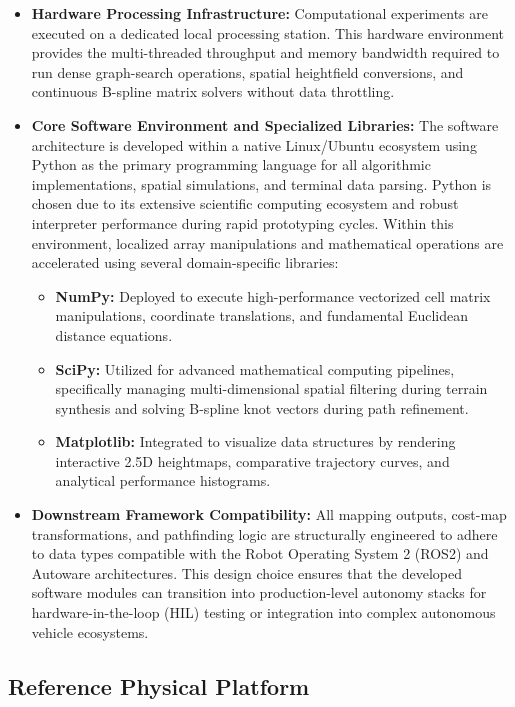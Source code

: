 \begin{itemize}
    \item \textbf{Hardware Processing Infrastructure:} Computational experiments are executed on a dedicated local processing station. This hardware environment provides the multi-threaded throughput and memory bandwidth required to run dense graph-search operations, spatial heightfield conversions, and continuous B-spline matrix solvers without data throttling.

    \item \textbf{Core Software Environment and Specialized Libraries:} The software architecture is developed within a native Linux/Ubuntu ecosystem using Python as the primary programming language for all algorithmic implementations, spatial simulations, and terminal data parsing. Python is chosen due to its extensive scientific computing ecosystem and robust interpreter performance during rapid prototyping cycles. Within this environment, localized array manipulations and mathematical operations are accelerated using several domain-specific libraries:
    \begin{itemize}
        \item \textbf{NumPy:} Deployed to execute high-performance vectorized cell matrix manipulations, coordinate translations, and fundamental Euclidean distance equations.
        \item \textbf{SciPy:} Utilized for advanced mathematical computing pipelines, specifically managing multi-dimensional spatial filtering during terrain synthesis and solving B-spline knot vectors during path refinement.
        \item \textbf{Matplotlib:} Integrated to visualize data structures by rendering interactive 2.5D heightmaps, comparative trajectory curves, and analytical performance histograms.
    \end{itemize}

    \item \textbf{Downstream Framework Compatibility:} All mapping outputs, cost-map transformations, and pathfinding logic are structurally engineered to adhere to data types compatible with the Robot Operating System 2 (ROS2) and Autoware architectures. This design choice ensures that the developed software modules can transition into production-level autonomy stacks for hardware-in-the-loop (HIL) testing or integration into complex autonomous vehicle ecosystems.
\end{itemize}

\subsection{Reference Physical Platform}

